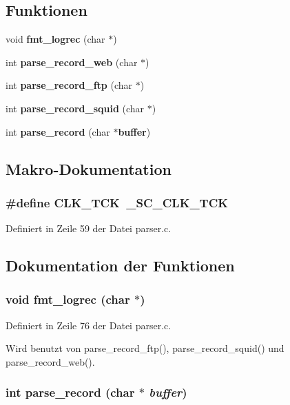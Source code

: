 \subsection*{Funktionen}
\begin{CompactItemize}
\item 
void {\bf fmt\_\-logrec} (char $\ast$)
\item 
int {\bf parse\_\-record\_\-web} (char $\ast$)
\item 
int {\bf parse\_\-record\_\-ftp} (char $\ast$)
\item 
int {\bf parse\_\-record\_\-squid} (char $\ast$)
\item 
int {\bf parse\_\-record} (char $\ast${\bf buffer})
\end{CompactItemize}


\subsection{Makro-Dokumentation}
\subsubsection{\setlength{\rightskip}{0pt plus 5cm}\#define CLK\_\-TCK~\_\-SC\_\-CLK\_\-TCK}\label{parser_8c_03df76d1f70664d745ca8de2864e39b3}




Definiert in Zeile 59 der Datei parser.c.

\subsection{Dokumentation der Funktionen}
\subsubsection{\setlength{\rightskip}{0pt plus 5cm}void fmt\_\-logrec (char $\ast$)}\label{parser_8c_05c2b956fa80dba2cd2fcce536158855}




Definiert in Zeile 76 der Datei parser.c.

Wird benutzt von parse\_\-record\_\-ftp(), parse\_\-record\_\-squid() und parse\_\-record\_\-web().
\subsubsection{\setlength{\rightskip}{0pt plus 5cm}int parse\_\-record (char $\ast$ {\em buffer})}\label{parser_8c_f7f838e64a0d2b296d0b8b09b49d6b85}




